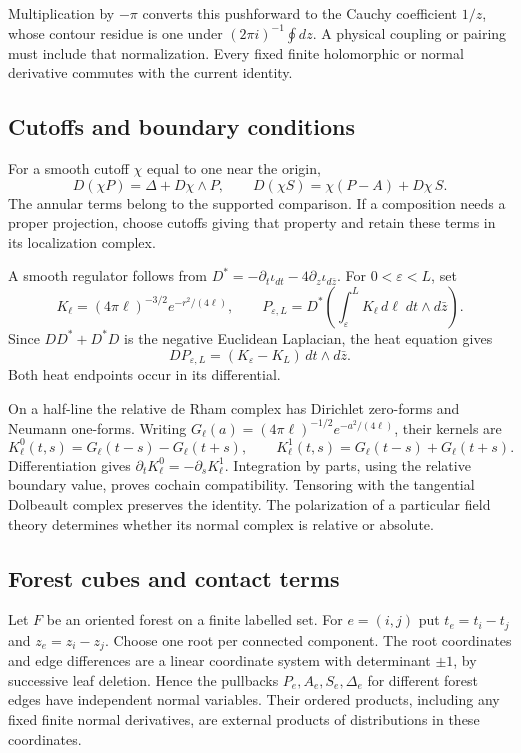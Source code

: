 Multiplication by $-\pi$ converts this pushforward to the Cauchy
coefficient $1/z$, whose contour residue is one under
$(2\pi i)^{-1}\oint dz$. A physical coupling or pairing must
include that normalization. Every fixed finite holomorphic or
normal derivative commutes with the current identity.

\subsection{Cutoffs and boundary conditions}

For a smooth cutoff $\chi$ equal to one near the origin,
\begin{equation}\label{eq:vol2-kernel-cutoff}
 D(\chi P)=\Delta+D\chi\wedge P,\qquad
 D(\chi S)=\chi(P-A)+D\chi\,S.
\end{equation}
The annular terms belong to the supported comparison. If a
composition needs a proper projection, choose cutoffs giving that
property and retain these terms in its localization complex.

A smooth regulator follows from
$D^*=-\partial_t\iota_{dt}-4\partial_z\iota_{d\bar z}$.
For $0<\varepsilon<L$, set
\[
 K_\ell=(4\pi\ell)^{-3/2}e^{-r^2/(4\ell)},\qquad
 P_{\varepsilon,L}
 =D^*\left(\int_\varepsilon^L K_\ell\,d\ell
                           \;dt\wedge d\bar z\right).
\]
Since $DD^*+D^*D$ is the negative Euclidean Laplacian,
the heat equation gives
\[
 DP_{\varepsilon,L}=(K_\varepsilon-K_L)\,dt\wedge d\bar z.
\]
Both heat endpoints occur in its differential.

On a half-line the relative de Rham complex has Dirichlet
zero-forms and Neumann one-forms. Writing
$G_\ell(a)=(4\pi\ell)^{-1/2}e^{-a^2/(4\ell)}$, their kernels are
\[
 K^0_\ell(t,s)=G_\ell(t-s)-G_\ell(t+s),\qquad
 K^1_\ell(t,s)=G_\ell(t-s)+G_\ell(t+s).
\]
Differentiation gives $\partial_tK^0_\ell=-\partial_sK^1_\ell$.
Integration by parts, using the relative boundary value, proves
cochain compatibility. Tensoring with the tangential Dolbeault
complex preserves the identity. The polarization of a particular
field theory determines whether its normal complex is relative
or absolute.

\subsection{Forest cubes and contact terms}

Let $F$ be an oriented forest on a finite labelled set. For
$e=(i,j)$ put $t_e=t_i-t_j$ and $z_e=z_i-z_j$.
Choose one root per connected component. The root coordinates
and edge differences are a linear coordinate system with
determinant $\pm1$, by successive leaf deletion. Hence the
pullbacks $P_e,A_e,S_e,\Delta_e$ for different forest edges
have independent normal variables. Their ordered products,
including any fixed finite normal derivatives, are external
products of distributions in these coordinates.

